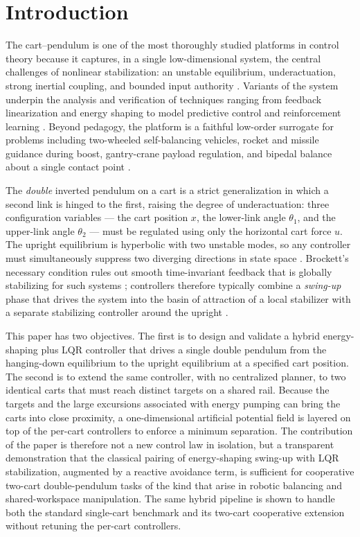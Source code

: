 \documentclass[conference]{IEEEtran}
\begin{document}
\section{Introduction}

The cart--pendulum is one of the most thoroughly studied platforms in control theory because it captures, in a single low-dimensional system, the central challenges of nonlinear stabilization: an unstable equilibrium, underactuation, strong inertial coupling, and bounded input authority \cite{boubaker2013survey,tedrake2023underactuated}. Variants of the system underpin the analysis and verification of techniques ranging from feedback linearization and energy shaping to model predictive control and reinforcement learning \cite{spong1995acrobot,astrom2000swingup,fantoni2002non}. Beyond pedagogy, the platform is a faithful low-order surrogate for problems including two-wheeled self-balancing vehicles, rocket and missile guidance during boost, gantry-crane payload regulation, and bipedal balance about a single contact point \cite{boubaker2013survey,siciliano2016handbook}.

The \emph{double} inverted pendulum on a cart is a strict generalization in which a second link is hinged to the first, raising the degree of underactuation: three configuration variables --- the cart position $x$, the lower-link angle $\theta_1$, and the upper-link angle $\theta_2$ --- must be regulated using only the horizontal cart force $u$. The upright equilibrium is hyperbolic with two unstable modes, so any controller must simultaneously suppress two diverging directions in state space \cite{lozano2000stabilization}. Brockett's necessary condition rules out smooth time-invariant feedback that is globally stabilizing for such systems \cite{brockett1983asymptotic,spong1995acrobot}; controllers therefore typically combine a \emph{swing-up} phase that drives the system into the basin of attraction of a local stabilizer with a separate stabilizing controller around the upright \cite{astrom2000swingup,furuta1992swingup}.

This paper has two objectives. The first is to design and validate a hybrid energy-shaping plus LQR controller that drives a single double pendulum from the hanging-down equilibrium to the upright equilibrium at a specified cart position. The second is to extend the same controller, with no centralized planner, to two identical carts that must reach distinct targets on a shared rail. Because the targets and the large excursions associated with energy pumping can bring the carts into close proximity, a one-dimensional artificial potential field \cite{khatib1986rtoa} is layered on top of the per-cart controllers to enforce a minimum separation. The contribution of the paper is therefore not a new control law in isolation, but a transparent demonstration that the classical pairing of energy-shaping swing-up with LQR stabilization, augmented by a reactive avoidance term, is sufficient for cooperative two-cart double-pendulum tasks of the kind that arise in robotic balancing and shared-workspace manipulation. The same hybrid pipeline is shown to handle both the standard single-cart benchmark and its two-cart cooperative extension without retuning the per-cart controllers.
\end{document}
